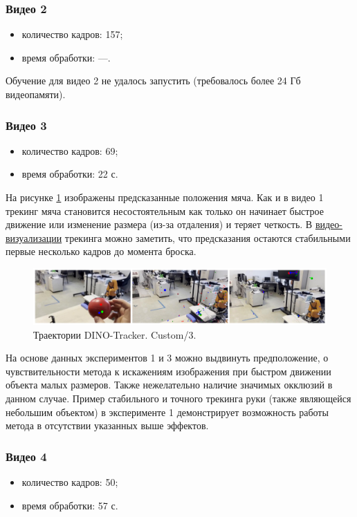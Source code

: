 \documentclass[a4paper, 14pt]{extarticle}
\theoremstyle{definition}
\theoremstyle{plain}
\theoremstyle{remark}
\begin{document}
\subsubsection{Видео 2}
\begin{itemize}
	\item количество кадров: 157;
	\item время обработки: ---.
\end{itemize}
Обучение для видео 2 не удалось запустить (требовалось более 24 Гб видеопамяти).

\subsubsection{Видео 3}
\begin{itemize}
	\item количество кадров: 69;
	\item время обработки: 22 с.
\end{itemize}

На рисунке \ref{fig:custom-3} изображены предсказанные положения мяча. Как и в видео 1 трекинг мяча становится несостоятельным как только он начинает быстрое движение или изменение размера (из-за отдаления) и теряет четкость. В \href{https://drive.google.com/file/d/1u9dOc59ZkDruSFHMgPoj0jT528nW_ne4/view?usp=drive_link}{видео-визуализации} трекинга можно заметить, что предсказания остаются стабильными первые несколько кадров до момента броска.
\begin{figure}
    [H]
    \centering
    \includegraphics[width=\textwidth]{figs/custom-3.png}
    \caption{Траектории DINO-Tracker. Custom/3.}
    \label{fig:custom-3}
\end{figure}

На основе данных экспериментов 1 и 3 можно выдвинуть предположение, о чувствительности метода к искажениям изображения при быстром движении объекта малых размеров. Также нежелательно наличие значимых окклюзий в данном случае. Пример стабильного и точного трекинга руки (также являющейся небольшим объектом) в эксперименте 1 демонстрирует возможность работы метода в отсутствии указанных выше эффектов.

\subsubsection{Видео 4}
\begin{itemize}
	\item количество кадров: 50;
	\item время обработки: 57 с.
\end{itemize}
\end{document}
